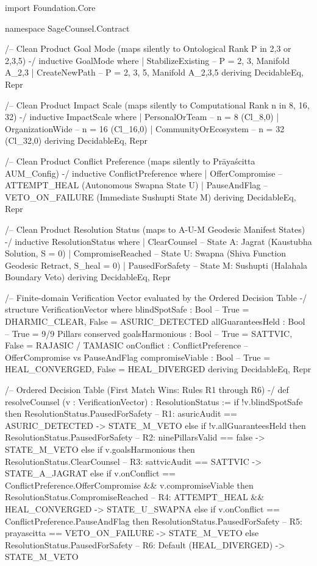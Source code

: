 \documentclass[11pt,a4paper]{article}
\begin{document}
\begin{code}
import Foundation.Core

namespace SageCounsel.Contract

/-- Clean Product Goal Mode (maps silently to Ontological Rank P in {2,3} or {2,3,5}) -/
inductive GoalMode where
  | StabilizeExisting -- P = {2, 3}, Manifold A_{2,3}
  | CreateNewPath     -- P = {2, 3, 5}, Manifold A_{2,3,5}
  deriving DecidableEq, Repr

/-- Clean Product Impact Scale (maps silently to Computational Rank n in {8, 16, 32}) -/
inductive ImpactScale where
  | PersonalOrTeam       -- n = 8  (Cl_{8,0})
  | OrganizationWide     -- n = 16 (Cl_{16,0})
  | CommunityOrEcosystem -- n = 32 (Cl_{32,0})
  deriving DecidableEq, Repr

/-- Clean Product Conflict Preference (maps silently to Prāyaścitta AUM_Config) -/
inductive ConflictPreference where
  | OfferCompromise -- ATTEMPT_HEAL (Autonomous Swapna State U)
  | PauseAndFlag    -- VETO_ON_FAILURE (Immediate Sushupti State M)
  deriving DecidableEq, Repr

/-- Clean Product Resolution Status (maps to A-U-M Geodesic Manifest States) -/
inductive ResolutionStatus where
  | ClearCounsel      -- State A: Jagrat (Kaustubha Solution, \delta S = 0)
  | CompromiseReached -- State U: Swapna (Shiva Function Geodesic Retract, \delta S_heal = 0)
  | PausedForSafety   -- State M: Sushupti (Halahala Boundary Veto)
  deriving DecidableEq, Repr

/-- Finite-domain Verification Vector evaluated by the Ordered Decision Table -/
structure VerificationVector where
  blindSpotSafe     : Bool               -- True = DHARMIC_CLEAR, False = ASURIC_DETECTED
  allGuaranteesHeld : Bool               -- True = 9/9 Pillars conserved
  goalsHarmonious   : Bool               -- True = SATTVIC, False = RAJASIC / TAMASIC
  onConflict        : ConflictPreference -- OfferCompromise vs PauseAndFlag
  compromiseViable  : Bool               -- True = HEAL_CONVERGED, False = HEAL_DIVERGED
  deriving DecidableEq, Repr

/-- Ordered Decision Table (First Match Wins: Rules R1 through R6) -/
def resolveCounsel (v : VerificationVector) : ResolutionStatus :=
  if !v.blindSpotSafe then
    ResolutionStatus.PausedForSafety          -- R1: asuricAudit == ASURIC_DETECTED -> STATE_M_VETO
  else if !v.allGuaranteesHeld then
    ResolutionStatus.PausedForSafety          -- R2: ninePillarsValid == false -> STATE_M_VETO
  else if v.goalsHarmonious then
    ResolutionStatus.ClearCounsel             -- R3: sattvicAudit == SATTVIC -> STATE_A_JAGRAT
  else if v.onConflict == ConflictPreference.OfferCompromise && v.compromiseViable then
    ResolutionStatus.CompromiseReached        -- R4: ATTEMPT_HEAL && HEAL_CONVERGED -> STATE_U_SWAPNA
  else if v.onConflict == ConflictPreference.PauseAndFlag then
    ResolutionStatus.PausedForSafety          -- R5: prayascitta == VETO_ON_FAILURE -> STATE_M_VETO
  else
    ResolutionStatus.PausedForSafety          -- R6: Default (HEAL_DIVERGED) -> STATE_M_VETO


\end{code}
\end{document}
